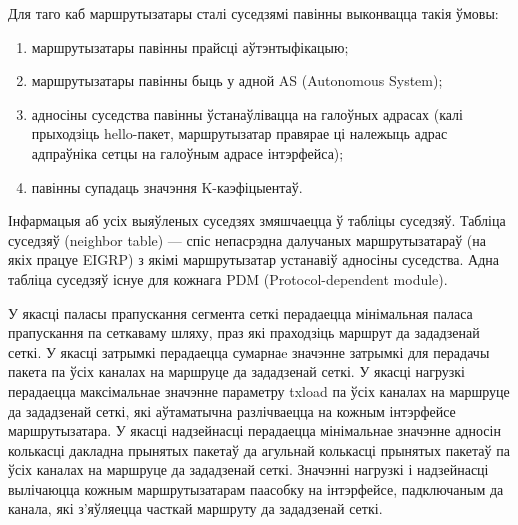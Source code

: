 Для таго каб маршрутызатары сталі суседзямі павінны выконвацца такія ўмовы:
\begin{enumerate}
    \item маршрутызатары павінны прайсці аўтэнтыфікацыю;
    \item маршрутызатары павінны быць у адной AS (Autonomous System);
    \item адносіны суседства павінны ўстанаўлівацца на галоўных адрасах (калі прыходзіць hello-пакет, маршрутызатар правярае ці належыць адрас адпраўніка сетцы на галоўным адрасе інтэрфейса);
    \item павінны супадаць значэння K-каэфіцыентаў.
\end{enumerate}

Інфармацыя аб усіх выяўленых суседзях змяшчаецца ў табліцы суседзяў.
Табліца суседзяў (neighbor table) --- спіс непасрэдна далучаных маршрутызатараў (на якіх працуе EIGRP) з якімі маршрутызатар устанавіў адносіны суседства. Адна табліца суседзяў існуе для кожнага PDM (Protocol-dependent module).
%
%

У якасці паласы прапускання сегмента сеткі перадаецца мінімальная
паласа прапускання па сеткаваму шляху, праз які праходзіць маршрут да зададзенай сеткі. У якасці затрымкі перадаецца сумарнаe значэнне затрымкі
для перадачы пакета па ўсіх каналах на маршруце да зададзенай сеткі. У якасці нагрузкі перадаецца максімальнае значэнне параметру txload па ўсіх каналах на маршруце да зададзенай сеткі, які аўтаматычна разлічваецца
на кожным інтэрфейсе маршрутызатара. У якасці надзейнасці перадаецца мінімальнае
значэнне адносін колькасці дакладна прынятых пакетаў да агульнай колькасці прынятых пакетаў па ўсіх каналах на маршруце да зададзенай сеткі. Значэнні
нагрузкі і надзейнасці вылічаюцца кожным маршрутызатарам паасобку
на інтэрфейсе, падключаным да канала, які з'яўляецца часткай маршруту
да зададзенай сеткі.


